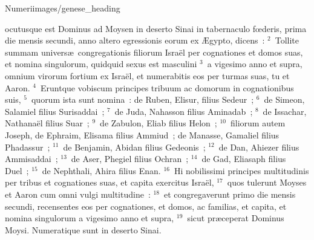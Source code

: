 {Numeri}{images/genese_heading}


\bchapter
{}ocutusque est Dominus ad Moysen in deserto Sinai in tabernaculo fœderis, prima die mensis secundi, anno altero egressionis eorum ex \AE gypto, dicens~:
${}^{2}$~Tollite summam univers\ae\ congregationis filiorum Isra\"el per cognationes et domos suas, et nomina singulorum, quidquid sexus est masculini
${}^{3}$~a vigesimo anno et supra, omnium virorum fortium ex Isra\"el, et numerabitis eos per turmas suas, tu et Aaron.
${}^{4}$~Eruntque vobiscum principes tribuum ac domorum in cognationibus suis,
${}^{5}$~quorum ista sunt nomina~: de Ruben, Elisur, filius Sedeur~;
${}^{6}$~de Simeon, Salamiel filius Surisaddai~;
${}^{7}$~de Juda, Nahasson filius Aminadab~;
${}^{8}$~de Issachar, Nathana\"el filius Suar~;
${}^{9}$~de Zabulon, Eliab filius Helon~;
${}^{10}$~filiorum autem Joseph, de Ephraim, Elisama filius Ammiud~; de Manasse, Gamaliel filius Phadassur~;
${}^{11}$~de Benjamin, Abidan filius Gedeonis~;
${}^{12}$~de Dan, Ahiezer filius Ammisaddai~;
${}^{13}$~de Aser, Phegiel filius Ochran~;
${}^{14}$~de Gad, Eliasaph filius Duel~;
${}^{15}$~de Nephthali, Ahira filius Enan.
${}^{16}$~Hi nobilissimi principes multitudinis per tribus et cognationes suas, et capita exercitus Isra\"el,
${}^{17}$~quos tulerunt Moyses et Aaron cum omni vulgi multitudine~:
${}^{18}$~et congregaverunt primo die mensis secundi, recensentes eos per cognationes, et domos, ac familias, et capita, et nomina singulorum a vigesimo anno et supra,
${}^{19}$~sicut pr\ae ceperat Dominus Moysi. Numeratique sunt in deserto Sinai.


